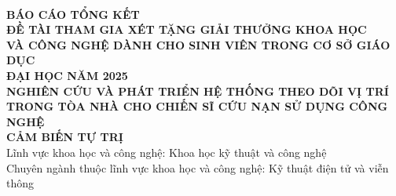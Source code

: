 \documentclass[a4paper]{article}
\begin{document}
\thispagestyle{empty}
\begin{center}
    \fontsize{13pt}{15pt}\\
    \vspace{3.8cm}
    \textbf{BÁO CÁO TỔNG KẾT}\\
    \vspace{1.5cm}
    \textbf{ĐỀ TÀI THAM GIA XÉT TẶNG GIẢI THƯỞNG KHOA HỌC}\\
    \textbf{VÀ CÔNG NGHỆ DÀNH CHO SINH VIÊN TRONG CƠ SỞ GIÁO DỤC}\\
    \textbf{ĐẠI HỌC NĂM 2025}\\
    \vspace{3.0cm}
    \textbf{NGHIÊN CỨU VÀ PHÁT TRIỂN HỆ THỐNG THEO DÕI VỊ TRÍ}\\
    \textbf{TRONG TÒA NHÀ CHO CHIẾN SĨ CỨU NẠN SỬ DỤNG CÔNG NGHỆ}\\
    \textbf{CẢM BIẾN TỰ TRỊ}\\
    \vspace{1.5cm}
    Lĩnh vực khoa học và công nghệ: Khoa học kỹ thuật và công nghệ\\
    Chuyên ngành thuộc lĩnh vực khoa học và công nghệ: Kỹ thuật điện tử và viễn thông
\end{center}
\fontsize{13pt}{15pt}

\pagebreak

\fontsize{13pt}{15pt}\selectfont
\end{document}
